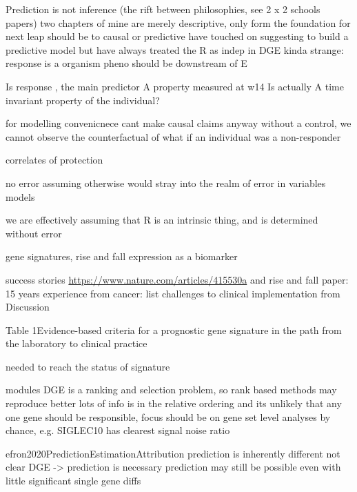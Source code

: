 \begin{outline}
    Prediction is not inference (the rift between philosophies, see 2 x 2 schools papers)
        two chapters of mine are merely descriptive, only form the foundation for next leap should be to causal or predictive
            have touched on suggesting to build a predictive model
        but have always treated the R as indep in DGE
        kinda strange: response is a organism pheno should be downstream of E

            Is response , the main predictor
            A property measured at w14
            Is actually A time invariant property of the individual?

            for modelling convenicnece
            cant make causal claims anyway
                without a control, we cannot observe the counterfactual of what if an individual was a non-responder

            correlates of protection

            no error
                assuming otherwise would stray into the realm of error in variables models
            
                we are effectively assuming that R is an intrinsic thing, and is determined without error

        gene signatures, rise and fall
            expression as a biomarker

            success stories \url{https://www.nature.com/articles/415530a} 
            and
            rise and fall paper: 15 years experience from cancer: list challenges to clinical implementation from Discussion

            Table 1Evidence-based criteria for a prognostic gene signature in the path from the laboratory to clinical practice

        needed to reach the status of signature

    modules
        DGE is a ranking and selection problem, so rank based methods may reproduce better
        lots of info is in the relative ordering
        and its unlikely that any one gene should be responsible, focus should be on gene set level analyses
        by chance, e.g. SIGLEC10 has clearest signal noise ratio
        
    efron2020PredictionEstimationAttribution prediction is inherently different
            not clear DGE -> prediction is necessary
            prediction may still be possible even with little significant single gene diffs


\end{outline}
